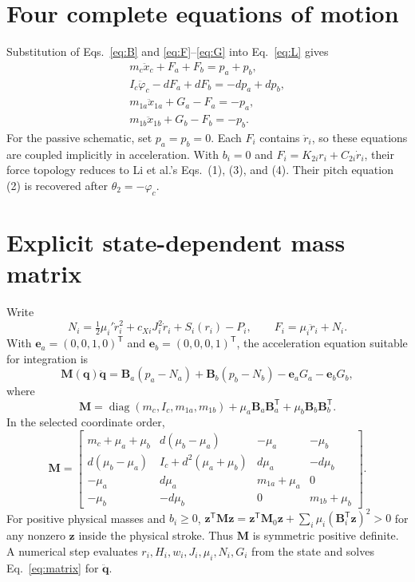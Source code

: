 \documentclass[a4paper,11pt]{article}
\numberwithin{equation}{section}
\newcommand{\bq}{\bm q}
\newcommand{\bB}{\bm B}
\newcommand{\bM}{\bm M}
\newcommand{\T}{\mathsf T}
\begin{document}
\section{Four complete equations of motion}
Substitution of Eqs.~\eqref{eq:B} and \eqref{eq:F}--\eqref{eq:G} into Eq.~\eqref{eq:L} gives
\begin{align}
\boxed{m_c\ddot x_c+F_a+F_b=p_a+p_b,}\label{eq:car}\\
\boxed{I_c\ddot\varphi_c-dF_a+dF_b=-dp_a+dp_b,}\label{eq:pitch}\\
\boxed{m_{1a}\ddot x_{1a}+G_a-F_a=-p_a,}\label{eq:bogiea}\\
\boxed{m_{1b}\ddot x_{1b}+G_b-F_b=-p_b.}\label{eq:bogieb}
\end{align}
For the passive schematic, set $p_a=p_b=0$. Each $F_i$ contains $\ddot r_i$, so these equations are coupled implicitly in acceleration. With $b_i=0$ and $F_i=K_{2i}r_i+C_{2i}\dot r_i$, their force topology reduces to Li et al.'s Eqs.~(1), (3), and (4). Their pitch equation (2) is recovered after $\theta_2=-\varphi_c$.

\section{Explicit state-dependent mass matrix}
Write
\begin{equation}
N_i=\tfrac12\mu_i'\dot r_i^2+c_{Xi}J_i^2\dot r_i+S_i(r_i)-P_i,
\qquad F_i=\mu_i\ddot r_i+N_i.\label{eq:N}
\end{equation}
With $\bm e_a=(0,0,1,0)^\T$ and $\bm e_b=(0,0,0,1)^\T$, the acceleration equation suitable for integration is
\begin{equation}
\boxed{\bM(\bq)\ddot{\bq}
=\bB_a(p_a-N_a)+\bB_b(p_b-N_b)-\bm e_aG_a-\bm e_bG_b,}\label{eq:matrix}
\end{equation}
where
\begin{equation}
\bM=\operatorname{diag}(m_c,I_c,m_{1a},m_{1b})
+\mu_a\bB_a\bB_a^\T+\mu_b\bB_b\bB_b^\T.\label{eq:Mouter}
\end{equation}
In the selected coordinate order,
\begin{equation}
\bM=\begin{bmatrix}
m_c+\mu_a+\mu_b & d(\mu_b-\mu_a)&-\mu_a&-\mu_b\\
d(\mu_b-\mu_a)&I_c+d^2(\mu_a+\mu_b)&d\mu_a&-d\mu_b\\
-\mu_a&d\mu_a&m_{1a}+\mu_a&0\\
-\mu_b&-d\mu_b&0&m_{1b}+\mu_b
\end{bmatrix}.\label{eq:Mexpanded}
\end{equation}
For positive physical masses and $b_i\ge0$, $\bm z^\T\bM\bm z=\bm z^\T\bM_0\bm z+\sum_i\mu_i(\bB_i^\T\bm z)^2>0$ for any nonzero $\bm z$ inside the physical stroke. Thus $\bM$ is symmetric positive definite. A numerical step evaluates $r_i,H_i,w_i,J_i,\mu_i,N_i,G_i$ from the state and solves Eq.~\eqref{eq:matrix} for $\ddot{\bq}$.
\end{document}
